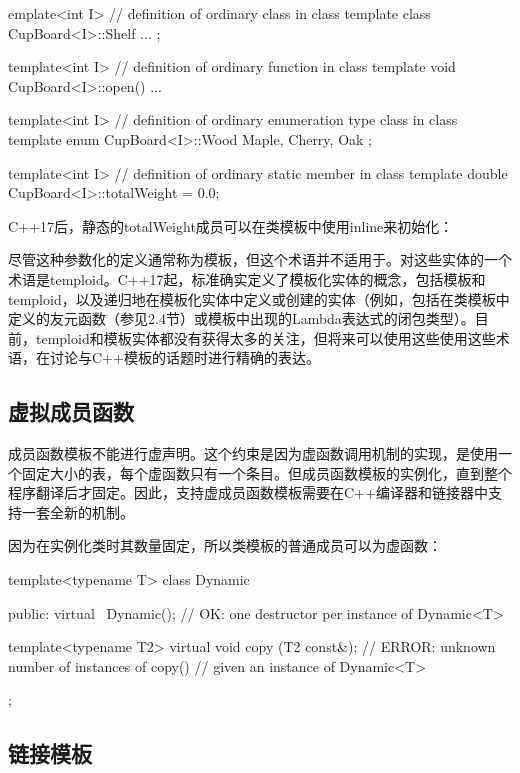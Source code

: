 \begin{cpp}
emplate<int I> // definition of ordinary class in class template
class CupBoard<I>::Shelf {
	...
};

template<int I> // definition of ordinary function in class template
void CupBoard<I>::open()
{
	...
}

template<int I> // definition of ordinary enumeration type class in class template
enum CupBoard<I>::Wood {
	Maple, Cherry, Oak
};

template<int I> // definition of ordinary static member in class template
double CupBoard<I>::totalWeight = 0.0;
\end{cpp}

C++17后，静态的totalWeight成员可以在类模板中使用inline来初始化：

\begin{cpp}
template<int I>
class CupBoard
	...
	inline static double totalWeight = 0.0;
};
\end{cpp}

尽管这种参数化的定义通常称为模板，但这个术语并不适用于。对这些实体的一个术语是temploid。C++17起，标准确实定义了模板化实体的概念，包括模板和temploid，以及递归地在模板化实体中定义或创建的实体（例如，包括在类模板中定义的友元函数（参见2.4节）或模板中出现的Lambda表达式的闭包类型）。目前，temploid和模板实体都没有获得太多的关注，但将来可以使用这些使用这些术语，在讨论与C++模板的话题时进行精确的表达。

\subsection{虚拟成员函数}

成员函数模板不能进行虚声明。这个约束是因为虚函数调用机制的实现，是使用一个固定大小的表，每个虚函数只有一个条目。但成员函数模板的实例化，直到整个程序翻译后才固定。因此，支持虚成员函数模板需要在C++编译器和链接器中支持一套全新的机制。

因为在实例化类时其数量固定，所以类模板的普通成员可以为虚函数：

\begin{cpp}
template<typename T>
class Dynamic {
	public:
	virtual ~Dynamic(); // OK: one destructor per instance of Dynamic<T>
	
	template<typename T2>
	virtual void copy (T2 const&);
						// ERROR: unknown number of instances of copy()
						// given an instance of Dynamic<T>
};
\end{cpp}

\subsection{链接模板}

